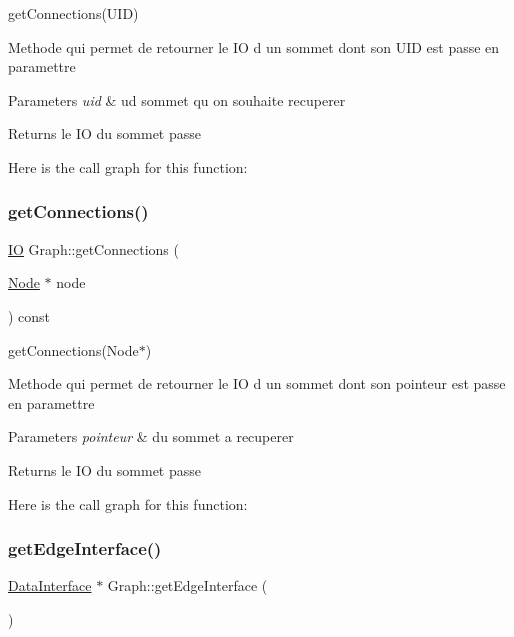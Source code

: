 get\+Connections(\+U\+I\+D) 

Methode qui permet de retourner le IO d un sommet dont son U\+ID est passe en paramettre


\begin{DoxyParams}{Parameters}
{\em uid} & ud sommet qu on souhaite recuperer \\
\hline
\end{DoxyParams}
\begin{DoxyReturn}{Returns}
le IO du sommet passe 
\end{DoxyReturn}
Here is the call graph for this function\+:
\mbox{\label{class_graph_ac925af39108ceec409a3083bc784604e}} 
\subsubsection{\texorpdfstring{get\+Connections()}{getConnections()}\hspace{0.1cm}{\footnotesize\ttfamily [2/2]}}
{\footnotesize\ttfamily \mbox{\hyperlink{_graph_8h_a383232190011cffd7d1fb05d72e89928}{IO}} Graph\+::get\+Connections (\begin{DoxyParamCaption}\item[{\mbox{\hyperlink{class_node}{Node}} $\ast$}]{node }\end{DoxyParamCaption}) const}



get\+Connections(\+Node$\ast$) 

Methode qui permet de retourner le IO d un sommet dont son pointeur est passe en paramettre


\begin{DoxyParams}{Parameters}
{\em pointeur} & du sommet a recuperer \\
\hline
\end{DoxyParams}
\begin{DoxyReturn}{Returns}
le IO du sommet passe 
\end{DoxyReturn}
Here is the call graph for this function\+:
\mbox{\label{class_graph_a1654657d157c6abdb0e1791946059c05}} 
\subsubsection{\texorpdfstring{get\+Edge\+Interface()}{getEdgeInterface()}}
{\footnotesize\ttfamily \mbox{\hyperlink{struct_data_interface}{Data\+Interface}} $\ast$ Graph\+::get\+Edge\+Interface (\begin{DoxyParamCaption}{ }\end{DoxyParamCaption})}



